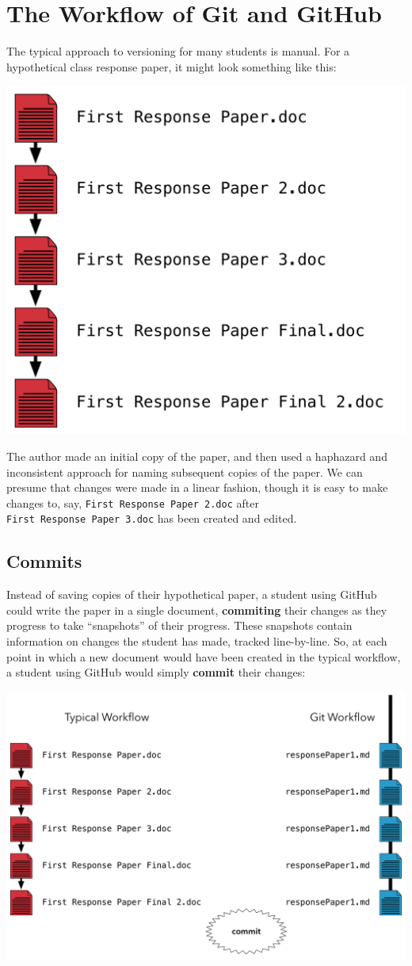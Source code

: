 \documentclass[]{book}
\theoremstyle{definition}
\theoremstyle{definition}
\theoremstyle{definition}
\theoremstyle{remark}
\begin{document}
\section{The Workflow of Git and
GitHub}\label{the-workflow-of-git-and-github}

The typical approach to versioning for many students is manual. For a
hypothetical class response paper, it might look something like this:

\begin{center}\includegraphics[width=0.5\linewidth]{images/gitFlow01} \end{center}

The author made an initial copy of the paper, and then used a haphazard
and inconsistent approach for naming subsequent copies of the paper. We
can presume that changes were made in a linear fashion, though it is
easy to make changes to, say, \texttt{First\ Response\ Paper\ 2.doc}
after \texttt{First\ Response\ Paper\ 3.doc} has been created and
edited.

\subsection{Commits}\label{commits}

Instead of saving copies of their hypothetical paper, a student using
GitHub could write the paper in a single document, \textbf{commiting}
their changes as they progress to take ``snapshots'' of their progress.
These snapshots contain information on changes the student has made,
tracked line-by-line. So, at each point in which a new document would
have been created in the typical workflow, a student using GitHub would
simply \textbf{commit} their changes:

\begin{center}\includegraphics[width=0.95\linewidth]{images/gitFlow02} \end{center}
\end{document}
